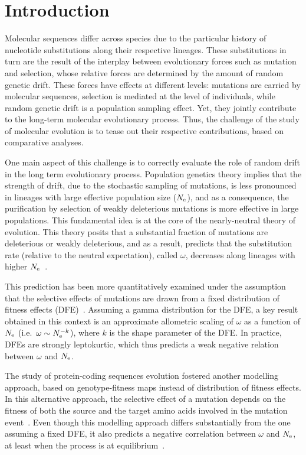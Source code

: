 \section{Introduction}
Molecular sequences differ across species due to the particular history of nucleotide {substitutions} along their respective lineages.
These {substitutions} in turn are the result of the interplay between evolutionary forces such as mutation and selection, whose relative forces are determined by the amount of random {genetic drift}.
These forces have effects at different levels: mutations are carried by molecular sequences, selection is mediated at the level of individuals, while random {genetic drift} is a population sampling effect.
Yet, they jointly contribute to the long-term molecular evolutionary process.
Thus, the challenge of the study of molecular evolution is to tease out their respective contributions, based on comparative analyses.

One main aspect of this challenge is to correctly evaluate the role of random drift in the long term evolutionary process.
Population genetics theory implies that the strength of drift, due to the stochastic sampling of mutations, is less pronounced in lineages with large {effective population size} ($N_{\text{e}}$), and as a consequence, the purification by selection of weakly deleterious mutations is more effective in large populations.
This fundamental idea is at the core of the {nearly-neutral} theory of evolution.
This theory posits that a substantial fraction of mutations are deleterious or weakly deleterious, and as a result, predicts that the {substitution} rate (relative to the {neutral} expectation), called $\omega$, decreases along lineages with higher $N_{\text{e}}$~\citep{Ohta1972, Ohta1992}.

This prediction has been more quantitatively examined under the assumption that the selective effects of mutations are drawn from a fixed distribution of fitness effects ({DFE})~\citep{Kimura1979, Welch2008}.
Assuming a gamma distribution for the {DFE}, a key result obtained in this context is an approximate allometric scaling of $\omega$ as a function of $N_{\text{e}}$ (i.e.~$\omega \sim N_{\text{e}}^{-k}$), where $k$ is the shape parameter of the {DFE}.
In practice, DFEs are strongly leptokurtic, which thus predicts a weak negative relation between $\omega$ and $N_{\text{e}}$.

The study of protein-coding sequences evolution fostered another modelling approach, based on genotype-fitness maps instead of distribution of fitness effects.
In this alternative approach, the selective effect of a mutation depends on the fitness of both the source and the target amino acids involved in the mutation event~\citep{Halpern1998, Rodrigue2010, Tamuri2012}.
Even though this modelling approach differs substantially from the one assuming a fixed {DFE}, it also predicts a negative correlation between $\omega$ and $N_{\text{e}}$, at least when the process is at equilibrium~\citep{Spielman2015, DosReis2015}.

